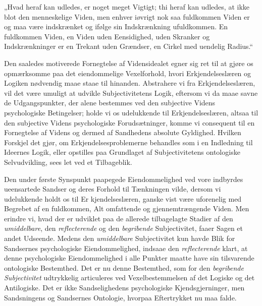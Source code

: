 \documentclass[12pt]{book}
\newcommand{\opage}[1]{\marginnote{\footnotesize\textit{[#1]}}}
\begin{document}
„Hvad heraf kan udledes, er noget meget Vigtigt; thi heraf kan udledes, at ikke blot den
menneskelige Viden, men enhver iøvrigt nok saa fuldkommen Viden er og maa være indskrænket og ifølge
sin Indskrænkning ufuldkommen. En fuldkommen Viden, en Viden uden Eensidighed, uden Skranker og
Indskrænkninger er en Trekant uden Grændser, en Cirkel med uendelig Radius.“

Den saaledes motiverede Fornegtelse af Vidensidealet egner sig ret til at gjøre os opmærksomme paa
det eiendommelige Vexelforhold, hvori Erkjendelseslæren og Logiken nødvendig maae staae til
hinanden. Abstrahere vi fra Erkjendelseslæren, vil det være umuligt at udvikle Subjectivitetens
Logik, eftersom vi da maae savne de Udgangspunkter, der alene bestemmes ved den subjective Videns
psychologiske Betingelser; holde vi os udelukkende til Erkjendelseslæren, altsaa til den subjective
Videns psychologiske Forudsætninger, komme vi consequent til en Fornegtelse af Videns og dermed af
Sandhedens absolute Gyldighed. Hvilken Forskjel det gjør, om Erkjendelsesproblemerne behandles som i
en Indledning til Ideernes Logik, eller opstilles paa Grundlaget af Subjectivitetens ontologiske
Selvudvikling, sees let ved et Tilbageblik.

Den under første Synspunkt paapegede Eiendommelighed ved vore indbyrdes ueensartede Sandser og deres
Forhold til Tænkningen vilde, dersom vi udelukkende holdt os til Er%
\opage{250} kjendelseslæren, ganske vist være uforenelig med Begrebet af en fuldkommen, Alt omfattende og
gjennemtrængende Viden. Men erindre vi, hvad der er udviklet paa de allerede tilbagelagte Stadier af
den \emph{umiddelbare}, den \emph{reflecterende} og den \emph{begribende} Subjectivitet, faaer Sagen
et andet Udseende. Medens den \emph{umiddelbare} Subjectivitet kun havde Blik for Sandsernes
psychologiske Eiendommelighed, indsaae den \emph{reflecterende} klart, at denne psychologiske
Eiendommelighed i alle Punkter maatte have sin tilsvarende ontologiske Bestemthed. Det er nu denne
Bestemthed, som for den \emph{begribende Subjectivitet} udtrykkelig articuleres ved
Vexelbestemmelsen af det Logiske og det Antilogiske. Det er ikke Sandselighedens psychologiske
Kjendsgjerninger, men Sandsningens og Sandsernes Ontologie, hvorpaa Eftertrykket nu maa falde.
\end{document}
